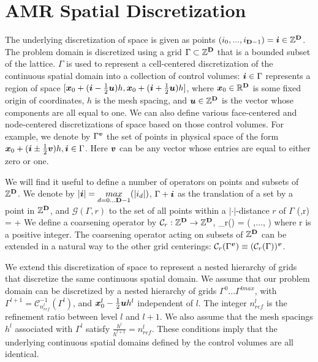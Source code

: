 
\section{AMR Spatial Discretization} \label{sect:AMRnotation}

The underlying discretization of space is given as points 
$(i_0, ... , i_{{\mathbf{D}} - 1}) = {\boldsymbol{i}} \in \mathbb{Z}^{\mathbf{D}}$. 
The problem domain is discretized using a grid 
$\Gamma \subset {\mathbb{Z}}^{\mathbf{D}}$
that is a bounded subset of the lattice.
$\Gamma$ is used to represent a cell-centered
discretization of the continuous spatial domain into a collection of
control volumes:  ${{\boldsymbol{i}}} \in \Gamma$ represents a
region of space $[{\boldsymbol{x}}_0 + ({\boldsymbol{i}} - \frac{1}{2}
{\boldsymbol{u}})h, {\boldsymbol{x}}_0 + ({\boldsymbol{i}} + \frac{1}{2}
{\boldsymbol{u}})h]$, where ${\boldsymbol{x}}_0 \in \mathbb{R}^{\mathbf{D}}$ is some fixed origin of
coordinates, $h$ is the mesh spacing, and ${\boldsymbol{u}} \in
{\mathbb{Z}}^{\mathbf{D}}$ is the vector whose components are all equal to one.
We can also define various face-centered and node-centered
discretizations of space based on those control volumes.  For example,
we denote by $\Gamma^{{\boldsymbol{v}}}$ the set of points in physical
space of the form ${\boldsymbol{x}}_0 + ({\boldsymbol{i}} \pm \frac{1}{2} {\boldsymbol{v}})
h, {\boldsymbol{i}} \in \Gamma$.  Here ${\boldsymbol{v}}$ can be any
vector whose entries are equal to either zero or one.

We will find it useful to define a number of operators on points and
subsets of $\mathbb{Z}^{\mathbf{D}}$. 
We denote by $|{\boldsymbol{i}}| = \underset{d = 0 \dots {\mathbf{D}} - 1}{max}(|i_d|)$, 
$\Gamma + {\boldsymbol{i}}$ as the translation of a set by a point in
${\mathbb{Z}}^{\mathbf{D}}$, and $\mathcal{G}(\Gamma,r)$ to the set of all points
within a $|\cdot|$-distance $r$ of $\Gamma$
\beqa
{}(\Gamma,r) =  \Gamma +
\ibold
\eeqa
We define a coarsening operator by
${\mathcal{C}}_r : {\mathbb{Z}}^{\mathbf{D}} \rightarrow {\mathbb{Z}}^{\mathbf{D}}$,
\beqa
{}_r(\ibold) = (\lfloor {} \rfloor,..., \lfloor
{} \rfloor)
\eeqa
where r is a positive integer.
The coarsening operator acting on subsets of $\mathbb{Z}^{\mathbf{D}}$ can be
extended in a natural way to the other grid centerings:  
${\mathcal{C}}_r(\Gamma^{{\boldsymbol{v}}}) \equiv ({\mathcal{C}}_r(\Gamma))^{{\boldsymbol{v}}}$.

We extend this discretization of space to represent a nested hierarchy of grids
that discretize the same continuous spatial domain.
We assume that our problem domain can be discretized by a nested
hierarchy of grids $\Gamma^0 ... \Gamma^{lmax}$, with $\Gamma^{l+1} = 
{\mathcal{C}}^{-1}_{n^l_{ref}}(\Gamma^l)$, and
${\boldsymbol{x}}^l_0 - \frac{1}{2} {\boldsymbol{u}} h^l$ independent of $l$.  The integer $n^l_{ref}$ is
the refinement ratio between level $l$ and $l+1$.  We also assume that
the mesh spacings $h^l$ associated with $\Gamma^l$ satisfy
$\frac{h^l}{h^{l+1}} = n^l_{ref}$.  These conditions imply that the
underlying continuous spatial domains defined by the control volumes 
are all identical.


